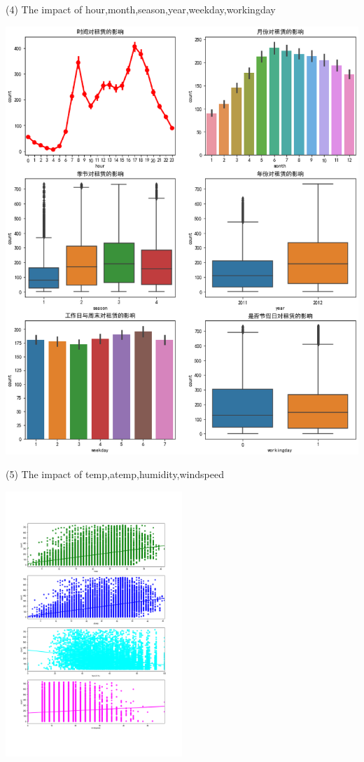 (4)  The impact of hour,month,season,year,weekday,workingday
\begin{center}
  \begin{minipage}{0.5\linewidth}
    \centering
    \includegraphics[height=0.8\textwidth]{pic/count all.eps}
  \end{minipage}
  
  \hfill
\end{center}




(5) The impact of temp,atemp,humidity,windspeed
\begin{center}
  \begin{minipage}[t]{1\linewidth}
    \centering
    \includegraphics[width=0.5\textwidth]{pic/three tahw.png}
  \end{minipage}
  \hfill
\end{center}

